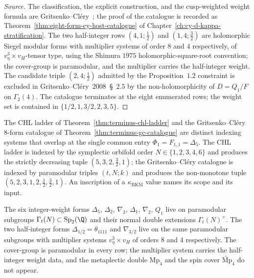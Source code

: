 \begin{proof}[Source]
The classification, the explicit construction, and the cusp-weighted
weight formula are Gritsenko--Cl\'ery~\cite[Theorem~1.4,
Theorem~3.1]{GritsenkoClery2013}; the proof of the catalogue is
recorded as Theorem~\ref{thm:eight-form-cy-host-catalogue} of
Chapter~\ref{ch:cy-d-kappa-stratification}.  The two half-integer
rows $(4, 1; \tfrac12)$ and $(1, 4; \tfrac32)$ are holomorphic
Siegel modular forms with multiplier systems of order $8$ and $4$
respectively, of $v_\eta^3 \times v_H$-tensor type, using the
Shimura $1975$ holomorphic-square-root convention; the cover-group
is paramodular, and the multiplier carries the half-integer weight.
The candidate triple $(2, 4; \tfrac12)$ admitted by the
Proposition~$1.2$ constraint is excluded in
Gritsenko--Cl\'ery~$2008$~\S~$2.5$ by the non-holomorphicity of
$D = Q_1/F$ on $\Gamma_2(4)$.  The catalogue terminates at the
eight enumerated rows; the weight set is contained in
$\{1/2, 1, 3/2, 2, 3, 5\}$.
\end{proof}

\begin{remark}
\label{rem:terminus-two-scopes}
The CHL ladder of Theorem~\ref{thm:terminus-chl-ladder} and the
Gritsenko--Cl\'ery $8$-form catalogue of
Theorem~\ref{thm:terminus-gc-catalogue} are distinct indexing
systems that overlap at the single common entry
$\Phi_1 = F_{1, 1} = \Delta_5$.  The CHL ladder is indexed by the
symplectic orbifold order $N \in \{1, 2, 3, 4, 6\}$ and produces
the strictly decreasing tuple $(5, 3, 2, \tfrac32, 1)$; the Gritsenko--Cl\'ery
catalogue is indexed by paramodular triples $(t, N; k)$ and
produces the non-monotone tuple
$(5, 2, 3, 1, 2, \tfrac12, \tfrac32, 1)$.  An inscription of a
$\kappa_{\mathrm{BKM}}$ value names its scope and its input.
\end{remark}

\begin{remark}
\label{rem:terminus-cover-stratification}
The six integer-weight forms $\Delta_5,\, \Delta_2,\, \nabla_3,\,
\Delta_1,\, \nabla_2,\, Q_1$ live on paramodular subgroups
$\Gamma_t(N) \subset \mathrm{Sp}_2(\Q)$ and their normal double
extensions $\Gamma_t(N)^+$.  The two half-integer forms
$\Delta_{1/2} = \theta_{1111}$ and $\nabla_{3/2}$ live on the same
paramodular subgroups with multiplier systems $v_\eta^3 \times v_H$
of orders $8$ and $4$ respectively.  The cover-group is paramodular
in every row; the multiplier system carries the half-integer weight
data, and the metaplectic double $\mathrm{Mp}_4$ and the spin cover
$\widetilde{\mathrm{Mp}}_4$ do not appear.
\end{remark}

